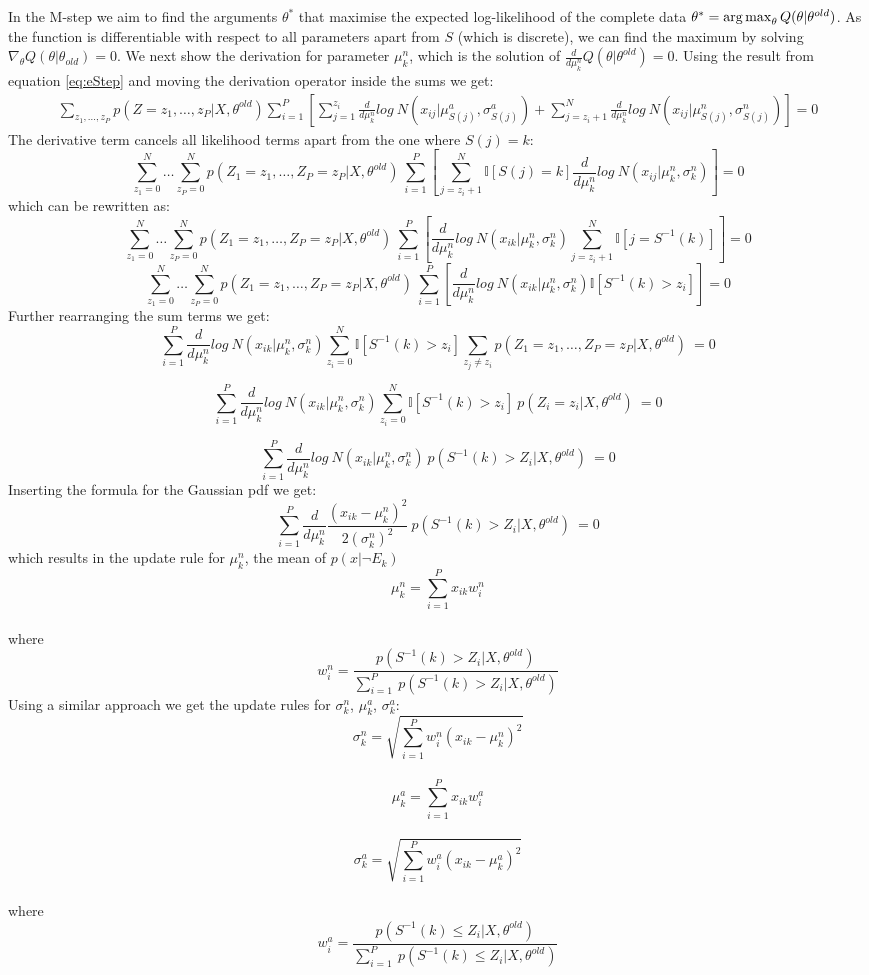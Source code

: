 In the M-step we aim to find the arguments $\theta^*$ that maximise the expected log-likelihood of the complete data $\theta^* = \operatorname*{arg\,max}_{\theta} Q(\theta | \theta^{old})$. As the function is differentiable with respect to all parameters apart from $S$ (which is discrete), we can find the maximum by solving $\nabla_{\theta}Q(\theta|\theta_{old}) = 0$. We next show the derivation for parameter $\mu_k^n$, which is the solution of  $\frac{d}{d\mu_k^n}Q(\theta | \theta^{old}) = 0 $. Using the result from equation \ref{eq:eStep} and moving the derivation operator inside the sums we get:
\begin{align*}
  \sum_{z_1, \dots, z_P}  p(Z = z_1, \dots, z_P |X, \theta^{old}) \sum_{i=1}^{P} \left[ \sum_{j=1}^{z_i}  \frac{d}{d\mu_k^n}log\ N(x_{ij}|\mu_{S(j)}^a, \sigma_{S(j)}^a) + \sum_{j=z_i + 1}^N \frac{d}{d\mu_k^n}log\ N(x_{ij}|\mu_{S(j)}^n, \sigma_{S(j)}^n) \right] = 0
\end{align*}
The derivative term cancels all likelihood terms apart from the one where $S(j) = k$:
$$ \sum_{z_1 = 0}^N \dots \sum_{z_P = 0}^N p(Z_1 = z_1, \dots, Z_P = z_P|X, \theta^{old})\ \sum_{i=1}^{P} \left[ \sum_{j=z_i + 1}^N \mathbb{I}[S(j) = k] \frac{d}{d\mu_k^n}log\ N(x_{ij}|\mu_k^n, \sigma_k^n) \right] = 0$$
which can be rewritten as:
$$ \sum_{z_1 = 0}^N \dots \sum_{z_P = 0}^N p(Z_1 = z_1, \dots, Z_P = z_P|X, \theta^{old})\ \sum_{i=1}^{P} \left[ \frac{d}{d\mu_k^n}log\ N(x_{ik}|\mu_k^n, \sigma_k^n) \sum_{j=z_i + 1}^N \mathbb{I}[j = S^{-1}(k)] \right] = 0$$
$$ \sum_{z_1 = 0}^N \dots \sum_{z_P = 0}^N p(Z_1 = z_1, \dots, Z_P = z_P|X, \theta^{old})\ \sum_{i=1}^{P} \left[ \frac{d}{d\mu_k^n}log\ N(x_{ik}|\mu_k^n, \sigma_k^n) \mathbb{I}[S^{-1}(k) > z_i] \right] = 0$$
Further rearranging the sum terms we get:
$$ \sum_{i=1}^{P} \frac{d}{d\mu_k^n}log\ N(x_{ik}|\mu_k^n, \sigma_k^n) \sum_{z_i = 0}^N \mathbb{I}[S^{-1}(k) > z_i] \sum_{z_j \ne z_i} p(Z_1 = z_1, \dots, Z_P = z_P|X, \theta^{old})\ = 0$$

$$ \sum_{i=1}^{P} \frac{d}{d\mu_k^n}log\ N(x_{ik}|\mu_k^n, \sigma_k^n) \sum_{z_i = 0}^N \mathbb{I}[S^{-1}(k) > z_i]\ p(Z_i = z_i | X, \theta^{old})\ = 0$$

$$ \sum_{i=1}^{P} \frac{d}{d\mu_k^n}log\ N(x_{ik}|\mu_k^n, \sigma_k^n) \ p(S^{-1}(k) > Z_i | X, \theta^{old})\ = 0$$
Inserting the formula for the Gaussian pdf we get:
$$ \sum_{i=1}^{P} \frac{d}{d\mu_k^n}\frac{(x_{ik} - \mu_k^n)^2}{2(\sigma_k^n)^2} \ p(S^{-1}(k) > Z_i | X, \theta^{old})\ = 0$$
which results in the update rule for $\mu_k^n$, the mean of $p(x|\neg E_k)$
$$ \mu_k^n = \sum_{i=1}^P x_{ik} w_i^n$$\\
where
$$w_i^n = \frac{p(S^{-1}(k) > Z_i | X, \theta^{old})}{\sum_{i=1}^P \ p(S^{-1}(k) > Z_i | X, \theta^{old})}$$
Using a similar approach we get the update rules for $\sigma_k^n$, $\mu_k^a$, $\sigma_k^a$:
$$ \sigma_k^n = \sqrt{\sum_{i=1}^P w_i^n (x_{ik} - \mu_k^n)^2}$$\\
$$ \mu_k^a = \sum_{i=1}^P x_{ik} w_i^a$$\\
$$ \sigma_k^a = \sqrt{\sum_{i=1}^P w_i^a (x_{ik} - \mu_k^a)^2}$$\\
where
$$w_i^a = \frac{p(S^{-1}(k) \leq Z_i | X, \theta^{old})}{\sum_{i=1}^P \ p(S^{-1}(k) \leq Z_i | X, \theta^{old})}$$

